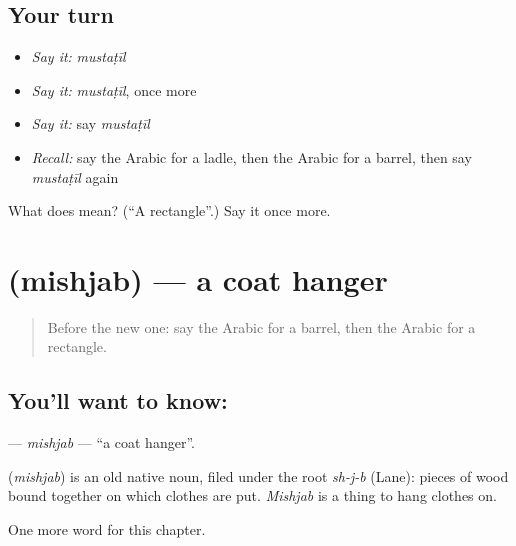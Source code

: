 \subsection*{Your turn}
\begin{itemize}
\raggedright
  \item \emph{Say it:} \emph{mustaṭīl}
  \item \emph{Say it:} \emph{mustaṭīl}, once more
  \item \emph{Say it:} say \emph{mustaṭīl}
  \item \emph{Recall:} say the Arabic for a ladle, then the Arabic for a barrel, then say \emph{mustaṭīl} again
\end{itemize}

\begin{tcolorbox}[breakable,colback=teal!4,colframe=teal!35!black,title={Before you move on}]
What does  mean? (\textquotedblleft{}A rectangle\textquotedblright{}.) Say it once more.
\end{tcolorbox}
\section[\texorpdfstring{\ar{مشجب} (mishjab)}{مشجب (mishjab)}]{ (mishjab) — a coat hanger}

\label{lesson:AR-C279-mishjab}



\begin{quote}
Before the new one: say the Arabic for a barrel, then the Arabic for a rectangle.
\end{quote}

\subsection*{You'll want to know: }
\textbf{} — \emph{mishjab} — \textquotedblleft{}a coat hanger\textquotedblright{}.

\begin{cousinweb}
\textbf{} (\emph{mishjab}) is an old native noun, filed under the root \emph{sh-j-b} (Lane): pieces of wood bound together on which clothes are put. \emph{Mishjab} is a thing to hang clothes on.
\end{cousinweb}

\begin{grammarlens}[title={What you've built}]
One more word for this chapter.
\end{grammarlens}

